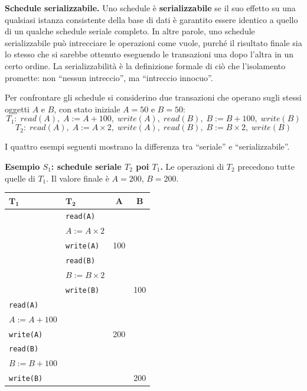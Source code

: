 \documentclass[12pt]{extarticle}
\begin{document}
\medskip
\noindent \textbf{Schedule serializzabile.} Uno schedule è \textbf{serializzabile} se il suo effetto su una qualsiasi istanza consistente della base di dati è garantito essere identico a quello di un qualche schedule seriale completo. In altre parole, uno schedule serializzabile può intrecciare le operazioni come vuole, purché il risultato finale sia lo stesso che si sarebbe ottenuto eseguendo le transazioni una dopo l'altra in un certo ordine. La serializzabilità è la definizione formale di ciò che l'isolamento promette: non ``nessun intreccio'', ma ``intreccio innocuo''.

\smallskip
\noindent Per confrontare gli schedule si considerino due transazioni che operano sugli stessi oggetti $A$ e $B$, con stato iniziale $A=50$ e $B=50$:
\[
T_1:\; read(A),\; A:=A+100,\; write(A),\; read(B),\; B:=B+100,\; write(B)
\]
\[
T_2:\; read(A),\; A:=A\times 2,\; write(A),\; read(B),\; B:=B\times 2,\; write(B)
\]

\noindent I quattro esempi seguenti mostrano la differenza tra ``seriale'' e ``serializzabile''.

\medskip
\noindent \textbf{Esempio $S_1$: schedule seriale $T_2$ poi $T_1$.} Le operazioni di $T_2$ precedono tutte quelle di $T_1$. Il valore finale è $A=200$, $B=200$.

\begin{center}
\small
\begin{tabular}{@{}llcc@{}}
    \toprule
    $\boldsymbol{T_1}$ & $\boldsymbol{T_2}$ & $\boldsymbol{A}$ & $\boldsymbol{B}$ \\
    \midrule
     & \texttt{read(A)}       &      &      \\
     & $A := A \times 2$      &      &      \\
     & \texttt{write(A)}      & 100  &      \\
     & \texttt{read(B)}       &      &      \\
     & $B := B \times 2$      &      &      \\
     & \texttt{write(B)}      &      & 100  \\
    \texttt{read(A)}       &      &      &      \\
    $A := A + 100$         &      &      &      \\
    \texttt{write(A)}      &      & 200  &      \\
    \texttt{read(B)}       &      &      &      \\
    $B := B + 100$         &      &      &      \\
    \texttt{write(B)}      &      &      & 200  \\
    \bottomrule
\end{tabular}
\end{center}
\end{document}
